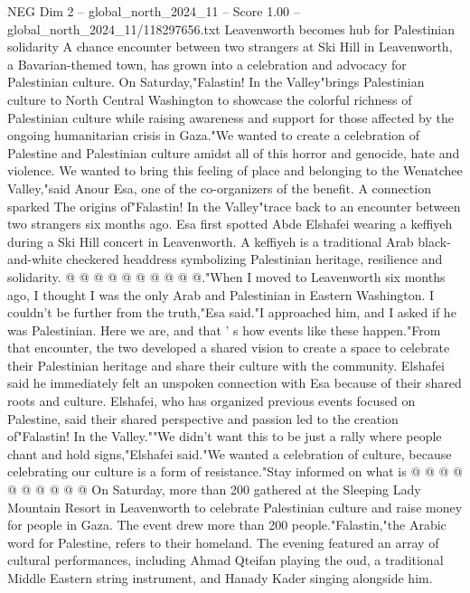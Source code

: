 \begin{textsample}{NEG Dim 2 – global\_north\_2024\_11 – Score 1.00 – global\_north\_2024\_11/118297656.txt}  \label{ex:f2_neg_189}
Leavenworth becomes hub for Palestinian solidarity A chance encounter between two strangers at Ski Hill in Leavenworth, a Bavarian-themed town, has grown into a celebration and advocacy for Palestinian culture.
On Saturday,"Falastin!
In the Valley"brings Palestinian culture to North Central Washington to showcase the colorful richness of Palestinian culture while raising awareness and support for those affected by the ongoing humanitarian crisis in Gaza."We wanted to create a celebration of Palestine and Palestinian culture amidst all of this horror and genocide, hate and violence.
We wanted to bring this feeling of place and belonging to the Wenatchee Valley,"said Anour Esa, one of the co-organizers of the benefit.
A connection sparked The origins of"Falastin!
In the Valley"trace back to an encounter between two strangers six months ago.
Esa first spotted Abde Elshafei wearing a keffiyeh during a Ski Hill concert in Leavenworth.
A keffiyeh is a traditional Arab black-and-white checkered headdress symbolizing Palestinian heritage, resilience and solidarity. @ @ @ @ @ @ @ @ @ @."When I moved to Leavenworth six months ago, I thought I was the only Arab and Palestinian in Eastern Washington.
I couldn't be further from the truth,"Esa said."I approached him, and I asked if he was Palestinian.
Here we are, and that ' s how events like these happen."From that encounter, the two developed a shared vision to create a space to celebrate their Palestinian heritage and share their culture with the community.
Elshafei said he immediately felt an unspoken connection with Esa because of their shared roots and culture.
Elshafei, who has organized previous events focused on Palestine, said their shared perspective and passion led to the creation of"Falastin!
In the Valley.""We didn't want this to be just a rally where people chant and hold signs,"Elshafei said."We wanted a celebration of culture, because celebrating our culture is a form of resistance."Stay informed on what is @ @ @ @ @ @ @ @ @ @ On Saturday, more than 200 gathered at the Sleeping Lady Mountain Resort in Leavenworth to celebrate Palestinian culture and raise money for people in Gaza.
The event drew more than 200 people."Falastin,"the Arabic word for Palestine, refers to their homeland.
The evening featured an array of cultural performances, including Ahmad Qteifan playing the oud, a traditional Middle Eastern string instrument, and Hanady Kader singing alongside him.

\end{textsample}
